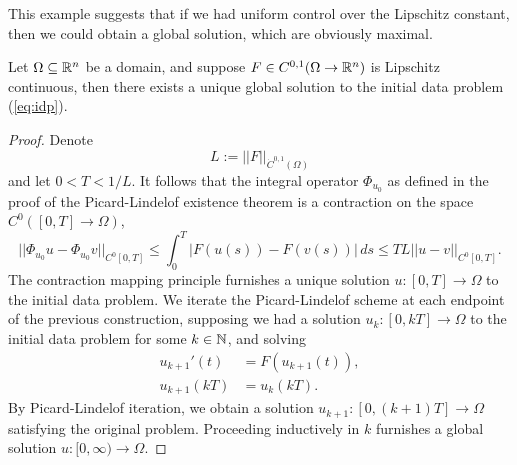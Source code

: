 This example suggests that if we had uniform control over the Lipschitz constant, then we could obtain a global solution, which are obviously maximal. 

\begin{proposition}
	Let $\Omega \subseteq \mathbb R^n$ be a domain, and suppose $F \in C^{0, 1} (\Omega \to \mathbb R^n)$ is Lipschitz continuous, then there exists a unique global solution to the initial data problem  (\ref{eq:idp}).
\end{proposition}

\begin{proof}
	Denote
		\[ L := ||F||_{\dot C^{0, 1} (\Omega)} \]
	and let $0 < T < 1/L$. It follows that the integral operator $\Phi_{u_0}$ as defined in the proof of the Picard-Lindelof existence theorem is a contraction on the space $C^0([0, T] \to \Omega)$, 
		\[ ||\Phi_{u_0}u  - \Phi_{u_0} v||_{C^0[0, T]}\leq  \int_0^T |F(u(s)) - F(v(s))| \, ds \leq TL ||u - v||_{C^0[0, T]}. \]
	The contraction mapping principle furnishes a unique solution $u : [0, T] \to \Omega$ to the initial data problem. We iterate the Picard-Lindelof scheme at each endpoint of the previous construction, supposing we had a solution $u_k : [0, kT] \to \Omega$ to the initial data problem for some $k \in \mathbb N$, and solving 
		\begin{align*}
			u_{k + 1}' (t) &= F(u_{k + 1} (t)), \\
			u_{k + 1} (kT)	&= u_k (kT).
		\end{align*}
	By Picard-Lindelof iteration, we obtain a solution $u_{k + 1} : [0, (k + 1) T] \to \Omega$ satisfying the original problem. Proceeding inductively in $k$ furnishes a global solution $u: [0, \infty) \to \Omega$.
\end{proof}
